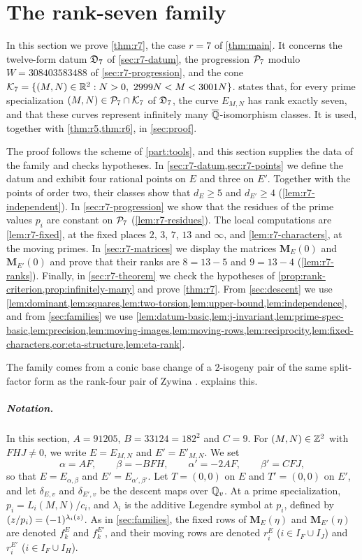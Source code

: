 \chapter{The rank-seven family}\label{sec:rank7}

In this section we prove \cref{thm:r7}, the case $r=7$ of \cref{thm:main}.
It concerns the twelve-form datum $\mathfrak D_7$ of \cref{sec:r7-datum}, the
progression $\mathcal P_7$ modulo $W=308403583488$ of \cref{sec:r7-progression},
and the cone $\cK_7=\{(M,N)\in\R^2:N>0,\ 2999N<M<3001N\}$. 
states that, for every prime specialization $(M,N)\in\mathcal P_7\cap\mathcal K_7$ of
$\mathfrak D_7$, the curve $E_{M,N}$ has rank exactly seven, and that these
curves represent infinitely many $\overline{\mathbb Q}$-isomorphism classes. It is used, together
with \cref{thm:r5,thm:r6}, in \cref{sec:proof}.

The proof follows the scheme of \cref{part:tools}, and this section supplies
the data of the family and checks hypotheses. In \cref{sec:r7-datum,sec:r7-points}
we define the datum and exhibit four rational points on $E$ and three on
$E'$. Together with the points of order two, their classes show that
$d_E\ge5$ and $d_{E'}\ge4$ (\cref{lem:r7-independent}). In
\cref{sec:r7-progression} we show that the residues of the prime values $p_i$
are constant on $\mathcal P_7$ (\cref{lem:r7-residues}). The local computations
are \cref{lem:r7-fixed}, at the fixed places $2$, $3$, $7$, $13$ and
$\infty$, and \cref{lem:r7-characters}, at the moving primes. In
\cref{sec:r7-matrices} we display the matrices $\mathbf M_E(0)$ and
$\mathbf M_{E'}(0)$ and prove that their ranks are $8=13-5$ and $9=13-4$
(\cref{lem:r7-ranks}). Finally, in \cref{sec:r7-theorem} we check the
hypotheses of \cref{prop:rank-criterion,prop:infinitely-many} and prove
\cref{thm:r7}. From \cref{sec:descent} we use
\cref{lem:dominant,lem:squares,lem:two-torsion,lem:upper-bound,lem:independence},
and from \cref{sec:families} we use
\cref{lem:datum-basic,lem:j-invariant,lem:prime-spec-basic,lem:precision,lem:moving-images,lem:moving-rows,lem:reciprocity,lem:fixed-characters,cor:eta-structure,lem:eta-rank}.

The family comes from a conic base change of a $2$-isogeny pair of the same
split-factor form as the rank-four pair of Zywina
\cite[\S6.5]{Zywina2026}.  explains this.

\paragraph{Notation.}
In this section, $A=91205$, $B=33124=182^2$ and $C=9$. For $(M,N)\in\mathbb Z^2$
with $FHJ\ne0$, we write $E=E_{M,N}$ and $E'=E'_{M,N}$. We set
\[
 \alpha=AF,\qquad \beta=-BFH,\qquad \alpha'=-2AF,\qquad \beta'=CFJ,
\]
so that $E=E_{\alpha,\beta}$ and $E'=E_{\alpha',\beta'}$. Let
$T=(0,0)$ on $E$ and $T'=(0,0)$ on $E'$, and let $\delta_{E,v}$ and
$\delta_{E',v}$ be the descent maps over $\mathbb Q_v$. At a prime
specialization, $p_i=L_i(M,N)/c_i$, and $\lambda_i$ is the additive
Legendre symbol at $p_i$, defined by $\leg z{p_i}=(-1)^{\lambda_i(z)}$. As in
\cref{sec:families}, the fixed rows of $\mathbf M_E(\eta)$ and
$\mathbf M_{E'}(\eta)$ are denoted $f^E_k$ and $f^{E'}_k$, and their moving
rows are denoted $r^E_i$ ($i\in I_F\cup I_J$) and $r^{E'}_i$
($i\in I_F\cup I_H$).

